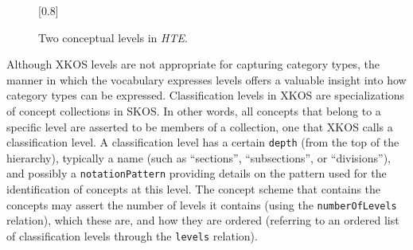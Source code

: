 %  

\begin{figure}[htb]
    \centering
		\scalebox{0.8}[0.8]{
		    
	}
	\caption[]{\label{fig:Stolk_thes-digital-form:fig2}Two conceptual levels in \textit{HTE}.%
	}
\end{figure}

Although XKOS levels are not appropriate for capturing category types, the manner in which the vocabulary expresses levels offers a valuable insight into how category types can be expressed. Classification levels in XKOS are specializations of concept collections in SKOS. In other words, all concepts that belong to a specific level are asserted to be members of a collection, one that XKOS calls a classification level. A classification level has a certain \texttt{depth} (from the top of the hierarchy), typically a name (such as ``sections'', ``subsections'', or ``divisions''), and possibly a \texttt{notationPattern} providing details on the pattern used for the identification of concepts at this level. The concept scheme that contains the concepts may assert the number of levels it contains (using the \texttt{numberOfLevels} relation), which these are, and how they are ordered (referring to an ordered list of classification levels through the \texttt{levels} relation).

